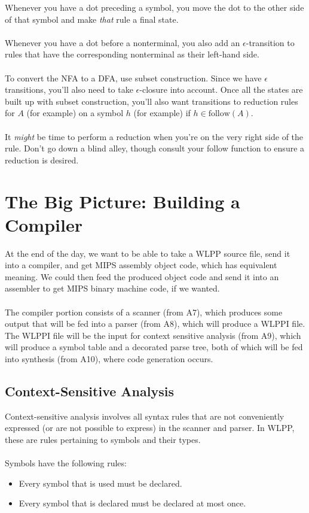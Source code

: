 \documentclass[]{article}
\theoremstyle{definition}
\newcommand{\lecture}[1]{\marginpar{{\footnotesize $\leftarrow$ \underline{#1}}}}
\begin{document}
				Whenever you have a dot preceding a symbol, you move the dot to the other side of that symbol and make \emph{that} rule a final state.
				\\ \\
				Whenever you have a dot before a nonterminal, you also add an $\epsilon$-transition to rules that have the corresponding nonterminal as their left-hand side.
				\\ \\
				To convert the NFA to a DFA, use subset construction. Since we have $\epsilon$ transitions, you'll also need to take $\epsilon$-closure into account. Once all the states are built up with subset construction, you'll also want transitions to reduction rules for $A$ (for example) on a symbol $h$ (for example) if $h \in \text{follow}(A)$.
				\\ \\
				It \emph{might} be time to perform a reduction when you're on the very right side of the rule. Don't go down a blind alley, though \textendash{} consult your follow function to ensure a reduction is desired.

	\section{The Big Picture: Building a Compiler} \lecture{March 13, 2013}
		At the end of the day, we want to be able to take a WLPP source file, send it into a compiler, and get MIPS assembly object code, which has equivalent meaning. We could then feed the produced object code and send it into an assembler to get MIPS binary machine code, if we wanted.
		\\ \\
		The compiler portion consists of a scanner (from A7), which produces some output that will be fed into a parser (from A8), which will produce a WLPPI file. The WLPPI file will be the input for context sensitive analysis (from A9), which will produce a symbol table and a decorated parse tree, both of which will be fed into synthesis (from A10), where code generation occurs.
		
		\subsection{Context-Sensitive Analysis}
			Context-sensitive analysis involves all syntax rules that are not conveniently expressed (or are not possible to express) in the scanner and parser. In WLPP, these are rules pertaining to symbols and their types.
			\\ \\
			Symbols have the following rules:
			\begin{itemize}
				\item Every symbol that is used must be declared.
				\item Every symbol that is declared must be declared at most once.
			\end{itemize}
\end{document}
